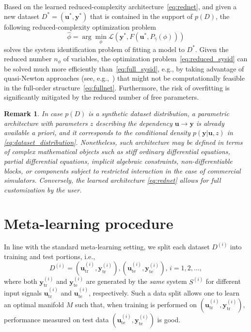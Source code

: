 \documentclass{article}
\newcommand{\ii}{{(i)}}
\newcommand{\tr}{\mathrm{tr}}
\newcommand{\te}{\mathrm{te}}
\newcommand{\seq}[1]{{\mathbf{#1}}}
\newcommand{\D}{D}
\newcommand{\redpar}{\phi}
\newcommand{\projpar}{\gamma}
\newcommand{\loss}{\mathcal{L}}
\newtheorem{remark}{Remark}%
\begin{document}
Based on the learned reduced-complexity architecture~\eqref{eq:rednet}, and given a new dataset $D^* = (\seq{u}^*, \seq{y}^*)$ that is contained in the support of $p(\D)$, the following reduced-complexity optimization problem
\begin{equation}
    \label{eq:reduced_sysid}
    \hat \redpar = \arg \min_{\redpar} \loss(\seq y^*, F(\seq u^*, P_{\hat\projpar}(\redpar)))
\end{equation}
solves the system identification problem of fitting a model to $D^*$.
Given the reduced number $n_\phi$ of variables, the optimization problem~\eqref{eq:reduced_sysid} can be solved much more efficiently than~\eqref{eq:full_sysid}, e.g., by taking advantage of quasi-Newton approaches (see, e.g.,~\cite{Bem25,Bem23}) that might not be computationally feasible in the full-order structure~\eqref{eq:fullnet}. Furthermore, the risk of overfitting is significantly mitigated by the reduced number of free parameters.

\begin{remark}
In case $p(\D)$ is a synthetic dataset distribution, a parametric architecture with parameters $z$ describing the dependency $\seq u \rightarrow \seq y$ is already available a priori, and it corresponds to the conditional density $p(\seq y | \seq u, z)$ in \eqref{eq:dataset_distribution}. Nonetheless, such architecture may be defined in terms of complex mathematical objects such as stiff ordinary differential equations, partial differential equations, implicit algebraic constraints, non-differentiable blocks, or components subject to restricted interaction in the case of commercial simulators. Conversely, the learned architecture \eqref{eq:rednet} allows for full customization by the user.
\end{remark}

\section{Meta-learning procedure}
\label{sec:reduced_order}
In line with the standard meta-learning setting, we split each dataset 
$D^\ii$ into training and test portions, i.e.,
\begin{equation}
\label{eq:dataset_stream_split}
D^\ii = (\seq{u}^\ii_\tr , \seq{y}^\ii_\tr ), (\seq{u}^\ii_\te , \seq{y}^\ii_\te ),\, i=1,2,\dots,
\end{equation}
where both $\seq{y}^\ii_\tr$ and $\seq{y}^\ii_\te$ are generated by the \emph{same} system $S^\ii$ for different input signals $\seq{u}^\ii_\tr$ and $\seq{u}^\ii_\te$, respectively.
Such a data split 
allows one to learn an optimal manifold $M$ such that, when training is performed on $(\seq{u}^\ii_\tr , \seq{y}^\ii_\tr )$, performance measured on test data 
$(\seq{u}^\ii_\te , \seq{y}^\ii_\te )$ is good. %
\end{document}
